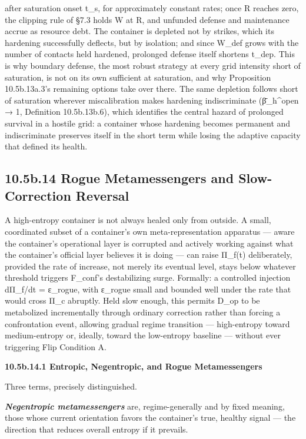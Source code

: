 \documentclass[
]{article}
\begin{document}
after saturation onset t\_s, for approximately constant rates; once R
reaches zero, the clipping rule of §7.3 holds W at R, and unfunded
defense and maintenance accrue as resource debt. The container is
depleted not by strikes, which its hardening successfully deflects, but
by isolation; and since W\_def grows with the number of contacts held
hardened, prolonged defense itself shortens t\_dep. This is why boundary
defense, the most robust strategy at every grid intensity short of
saturation, is not on its own sufficient at saturation, and why
Proposition 10.5b.13a.3's remaining options take over there. The same
depletion follows short of saturation wherever miscalibration makes
hardening indiscriminate (β̄\_h\^{}open → 1, Definition 10.5b.13b.6),
which identifies the central hazard of prolonged survival in a hostile
grid: a container whose hardening becomes permanent and indiscriminate
preserves itself in the short term while losing the adaptive capacity
that defined its health.

\hypertarget{b.14-rogue-metamessengers-and-slow-correction-reversal}{%
\subsection{10.5b.14 Rogue Metamessengers and Slow-Correction
Reversal}\label{b.14-rogue-metamessengers-and-slow-correction-reversal}}

A high-entropy container is not always healed only from outside. A
small, coordinated subset of a container's own meta-representation
apparatus --- aware the container's operational layer is corrupted and
actively working against what the container's official layer believes it
is doing --- can raise Π\_f(t) deliberately, provided the rate of
increase, not merely its eventual level, stays below whatever threshold
triggers F\_conf's destabilizing surge. Formally: a controlled injection
dΠ\_f/dt = ε\_rogue, with ε\_rogue small and bounded well under the rate
that would cross Π\_c abruptly. Held slow enough, this permits D\_op to
be metabolized incrementally through ordinary correction rather than
forcing a confrontation event, allowing gradual regime transition ---
high-entropy toward medium-entropy or, ideally, toward the low-entropy
baseline --- without ever triggering Flip Condition A.

\textbf{10.5b.14.1 Entropic, Negentropic, and Rogue Metamessengers}

Three terms, precisely distinguished.

\emph{\textbf{Negentropic metamessengers}} are, regime-generally and by
fixed meaning, those whose current orientation favors the container's
true, healthy signal --- the direction that reduces overall entropy if
it prevails.
\end{document}
